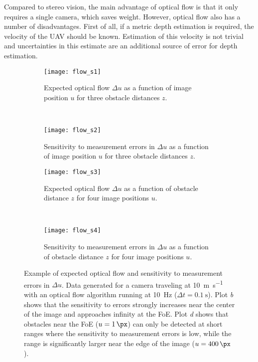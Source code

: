 \medskip

Compared to stereo vision, the main advantage of optical flow is that it only requires a single camera, which saves weight.
However, optical flow also has a number of disadvantages.
First of all, if a metric depth estimation is required, the velocity of the \ac{UAV} should be known.
Estimation of this velocity is not trivial and uncertainties in this estimate are an additional source of error for depth estimation.

\begin{figure}
\centering
\begin{subfigure}[t]{0.45\textwidth}
\texttt{[image: flow\_s1]}
\caption{Expected optical flow $\Delta u$ as a function of image position $u$ for three obstacle distances $z$.}
\end{subfigure}
~
\begin{subfigure}[t]{0.45\textwidth}
\texttt{[image: flow\_s2]}
\caption{Sensitivity to measurement errors in $\Delta u$ as a function of image position $u$ for three obstacle distances $z$.}
\end{subfigure}

\begin{subfigure}[t]{0.45\textwidth}
\texttt{[image: flow\_s3]}
\caption{Expected optical flow $\Delta u$ as a function of obstacle distance $z$ for four image positions $u$.}
\end{subfigure}
~
\begin{subfigure}[t]{0.45\textwidth}
\texttt{[image: flow\_s4]}
\caption{Sensitivity to measurement errors in $\Delta u$ as a function of obstacle distance $z$ for four image positions $u$.}
\end{subfigure}
\caption{Example of expected optical flow and sensitivity to measurement errors in $\Delta u$. Data generated for a camera traveling at \SI{10}{\meter\per\second} with an optical flow algorithm running at \SI{10}{\Hz} ($\Delta t = \SI{0.1}{\s}$). Plot \emph{b} shows that the sensitivity to errors strongly increases near the center of the image and approaches infinity at the \ac{FoE}. Plot \emph{d} shows that obstacles near the \ac{FoE} ($u=\SI{1}{\px}$) can only be detected at short ranges where the sensitivity to measurement errors is low, while the range is significantly larger near the edge of the image ($u=\SI{400}{\px}$).}
\label{fig:of_sensitivity}
\end{figure}

